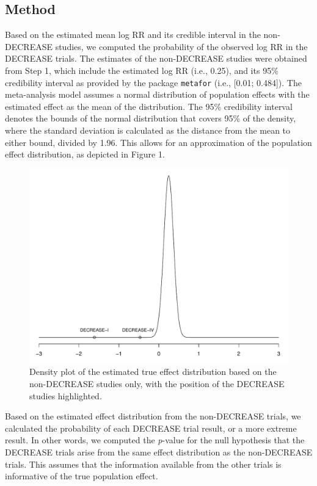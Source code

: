 \documentclass[]{article}
\begin{document}
\subsection{Method}\label{method}

Based on the estimated mean log RR and its credible interval in the
non-DECREASE studies, we computed the probability of the observed log RR
in the DECREASE trials. The estimates of the non-DECREASE studies were
obtained from Step 1, which include the estimated log RR (i.e., 0.25),
and its 95\% credibility interval as provided by the package
\texttt{metafor} (i.e., {[}0.01; 0.484{]}). The meta-analysis model
assumes a normal distribution of population effects with the estimated
effect as the mean of the distribution. The 95\% credibility interval
denotes the bounds of the normal distribution that covers 95\% of the
density, where the standard deviation is calculated as the distance from
the mean to either bound, divided by 1.96. This allows for an
approximation of the population effect distribution, as depicted in
Figure 1.

\begin{figure}

{\centering \includegraphics[width=0.8\linewidth]{../figures/fig1} 

}

\caption{Density plot of the estimated true effect distribution based on the non-DECREASE studies only, with the position of the DECREASE studies highlighted.}\label{fig:figure 1}
\end{figure}

Based on the estimated effect distribution from the non-DECREASE trials,
we calculated the probability of each DECREASE trial result, or a more
extreme result. In other words, we computed the \emph{p}-value for the
null hypothesis that the DECREASE trials arise from the same effect
distribution as the non-DECREASE trials. This assumes that the
information available from the other trials is informative of the true
population effect.
\end{document}

